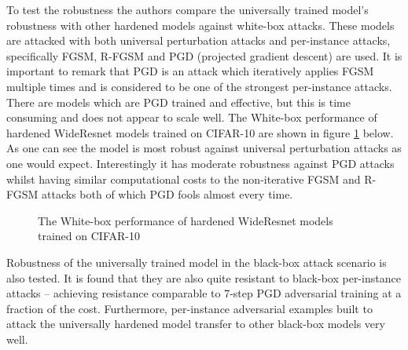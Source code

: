 To test the robustness the authors compare the universally trained model's robustness with other hardened models against white-box attacks. These models are attacked with both universal perturbation attacks and per-instance attacks, specifically FGSM, R-FGSM and PGD (projected gradient descent) are used. It is important to remark that PGD is an attack which iteratively applies FGSM multiple times and is considered to be one of the strongest per-instance attacks. There are models which are PGD trained and effective, but this is time consuming and does not appear to scale well. The White-box performance of hardened WideResnet models trained on CIFAR-10 are shown in figure \ref{table} below.
As one can see the model is most robust against universal perturbation attacks as one would expect. Interestingly it has moderate robustness against PGD attacks whilst having similar computational costs to the non-iterative FGSM and R-FGSM attacks both of which PGD fools almost every time. 
\begin{figure}[b] \label{table}
\caption{ The White-box performance of hardened WideResnet models trained on CIFAR-10}
\centering
\end{figure}


Robustness of the universally trained model in the black-box attack scenario is also tested. It is found that they are also quite resistant to black-box per-instance attacks – achieving resistance comparable to 7-step PGD adversarial training at a fraction of the cost. Furthermore, per-instance adversarial examples built to attack the universally hardened model transfer to other black-box models very well.